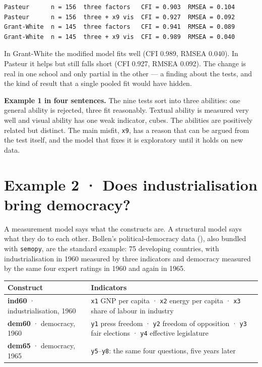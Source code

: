 \documentclass[
  letterpaper,
  10pt,
  twoside,
  openright,
  numbers=noenddot,
  chapterprefix=true]{scrbook}
\begin{document}
\begin{verbatim}
Pasteur      n = 156  three factors   CFI = 0.903  RMSEA = 0.104
Pasteur      n = 156  three + x9 vis  CFI = 0.927  RMSEA = 0.092
Grant-White  n = 145  three factors   CFI = 0.941  RMSEA = 0.089
Grant-White  n = 145  three + x9 vis  CFI = 0.989  RMSEA = 0.040
\end{verbatim}

In Grant-White the modified model fits well (CFI 0.989, RMSEA 0.040). In
Pasteur it helps but still falls short (CFI 0.927, RMSEA 0.092). The
change is real in one school and only partial in the other --- a finding
about the tests, and the kind of result that a single pooled fit would
have hidden.

\textbf{Example 1 in four sentences.} The nine tests sort into three
abilities: one general ability is rejected, three fit reasonably.
Textual ability is measured very well and visual ability has one weak
indicator, cubes. The abilities are positively related but distinct. The
main misfit, \texttt{x9}, has a reason that can be argued from the test
itself, and the model that fixes it is exploratory until it holds on new
data.

\section{Example 2 · Does industrialisation bring
democracy?}\label{example-2-does-industrialisation-bring-democracy}

A measurement model says what the constructs are. A structural model
says what they do to each other. Bollen's political-democracy data
(), also bundled with
\texttt{semopy}, are the standard example: 75 developing countries, with
industrialisation in 1960 measured by three indicators and democracy
measured by the same four expert ratings in 1960 and again in 1965.

\begin{longtable}[]{@{}
  >{\raggedright\arraybackslash}p{}
  >{\raggedright\arraybackslash}p{}@{}}
\toprule\noalign{}
\begin{minipage}[b]{\linewidth}\raggedright
Construct
\end{minipage} & \begin{minipage}[b]{\linewidth}\raggedright
Indicators
\end{minipage} \\
\midrule\noalign{}
\endhead
\bottomrule\noalign{}
\endlastfoot
\textbf{ind60} · industrialisation, 1960 & \texttt{x1} GNP per capita ·
\texttt{x2} energy per capita · \texttt{x3} share of labour in
industry \\
\textbf{dem60} · democracy, 1960 & \texttt{y1} press freedom ·
\texttt{y2} freedom of opposition · \texttt{y3} fair elections ·
\texttt{y4} effective legislature \\
\textbf{dem65} · democracy, 1965 & \texttt{y5}--\texttt{y8}: the same
four questions, five years later \\
\end{longtable}
\end{document}
